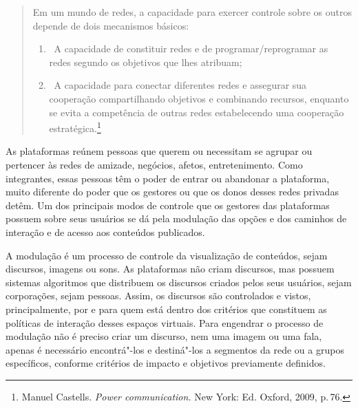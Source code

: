 

\begin{quote}
Em um mundo de redes, a capacidade para exercer controle sobre os outros
depende de dois mecanismos básicos:
\begin{enumerate}
\item\, A capacidade de constituir redes
e de programar/reprogramar as redes segundo os objetivos que lhes
atribuam;
\item\, A capacidade para conectar diferentes redes e assegurar
sua cooperação compartilhando objetivos e combinando recursos, enquanto
se evita a competência de outras redes estabelecendo uma cooperação
estratégica.\footnote{Manuel Castells. \textit{Power communication.} New York: Ed. Oxford,
2009, p.\,76.}
\end{enumerate}
\end{quote}

As plataformas reúnem pessoas que querem ou necessitam se agrupar ou
pertencer às redes de amizade, negócios, afetos, entretenimento. Como
integrantes, essas pessoas têm o poder de entrar ou abandonar a
plataforma, muito diferente do poder que os gestores ou que os donos
desses redes privadas detêm. Um dos principais modos de controle que os
gestores das plataformas possuem sobre seus usuários se dá pela
modulação das opções e dos caminhos de interação e de acesso aos
conteúdos publicados.

A modulação é um processo de controle da visualização de conteúdos,
sejam discursos, imagens ou sons. As plataformas não criam discursos,
mas possuem sistemas algoritmos que distribuem os discursos criados
pelos seus usuários, sejam corporações, sejam pessoas. Assim, os
discursos são controlados e vistos, principalmente, por e para quem está
dentro dos critérios que constituem as políticas de interação desses
espaços virtuais. Para engendrar o processo de modulação não é preciso
criar um discurso, nem uma imagem ou uma fala, apenas é necessário
encontrá"-los e destiná"-los a segmentos da rede ou a grupos específicos,
conforme critérios de impacto e objetivos previamente definidos.

